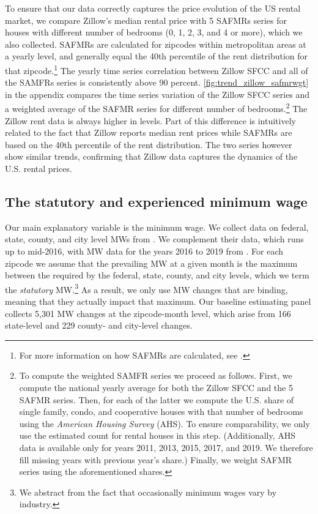 To ensure that our data correctly captures the price evolution of the US rental market, 
we compare Zillow's median rental price with 5 SAFMRs series for houses with different 
number of bedrooms (0, 1, 2, 3, and 4 or more), which we also collected. SAFMRs are 
calculated for zipcodes within metropolitan areas at a yearly level, and generally equal 
the 40th percentile of the rent distribution for that zipcode.\footnote{For more 
	information on how SAFMRs are calculated, see \textcite[][page 41641]{hudPreamble}.} 
The yearly time series correlation between Zillow SFCC and all of the SAMFRs series is 
consistently above 90 percent. \autoref{fig:trend_zillow_safmrwgt} in the appendix 
compares the time series variation of the Zillow SFCC series and a weighted average of 
the SAFMR series for different number of bedrooms.\footnote{
	\label{foot:zillow_time_series}
	To compute the weighted SAMFR series we proceed as follows. First, we compute the 
	national yearly average for both the Zillow SFCC and the 5 	SAFMR series. Then, for 
	each of the latter we compute the U.S. share of single family, condo, and cooperative 
	houses with that number of bedrooms using the \textit{American Housing Survey} (AHS). 
	To ensure comparability, we only use the estimated count for rental houses in this 
	step. (Additionally, AHS data is available only for years 2011, 2013, 2015, 2017, and 
	2019. We therefore fill missing years with previous year's share.) Finally, we weight 
	SAFMR series using the aforementioned shares.} 
The Zillow rent data is always higher in levels. Part of this difference is intuitively 
related to the fact that Zillow reports median rent prices while SAFMRs are based on the 
40th percentile of the rent distribution. The two series however show similar trends, 
confirming that Zillow data captures the dynamics of the U.S. rental prices.

\subsection{The statutory and experienced minimum wage}

Our main explanatory variable is the minimum wage. We collect data on federal, state, 
county, and city level MWs from \textcite{VaghulZipperer2016}. We complement their data,
which runs up to mid-2016, with MW data for the years 2016 to 2019 from 
\textcite{BerkeleyLaborCenter}. For each zipcode we assume that the prevailing MW at a 
given month is the maximum between the required by the federal, state, county, and city 
levels, which we term the \textit{statutory} MW.\footnote{We abstract from the fact that 
	occasionally minimum wages vary by industry.} %
As a result, we only use MW changes that are binding, meaning that they actually impact 
that maximum. Our baseline estimating panel collects 5,301 MW changes at the zipcode-month 
level, which arise from 166 state-level and 229 county- and city-level changes.

